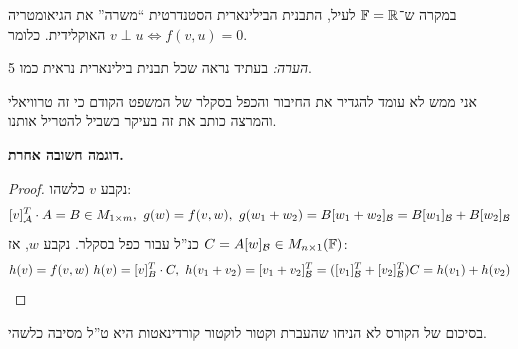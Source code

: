 \documentclass[]{../../../../tex/classes/styledArticle}
\begin{document}
    במקרה ש־$\mathbb{F} = \mathbb{R}$ לעיל, התבנית הבילינארית הסטנדרטית ``משרה'' את הגיאומטריה האוקלידית. כלומר $v \perp u \iff f(v, u) = 0$. 
    
    \textit{הערה: }בעתיד נראה שכל תבנית בילינארית נראית כמו 5. 
    
    אני ממש לא עומד להגדיר את החיבור והכפל בסקלר של המשפט הקודם כי זה טרוויאלי והמרצה כותב את זה בעיקר בשביל להטריל אותנו. 
    
    \textbf{דוגמה חשובה אחרת. }
    \begin{proof}
        נקבע $v$ כלשהו: 
        \[ [v]_{\mathcal{A}}^T \cdot A = B \in M_{1 \times m}, \ g(w) = f(v, w), \ g(w_1 + w_2) = B[w_1 + w_2]_{\mathcal{B}} = B[w_1]_{\mathcal{B}} + B[w_2]_{\mathcal{B}} \]
        כנ''ל עבור כפל בסקלר. 
        נקבע $w$, אז $C = A[w]_{\mathcal{B}} \in M_{n \times 1}(\mathbb{F})$: 
        \[ h(v) = f(v, w) \ h(v) = [v]_B^T \cdot C, \ h(v_1 + v_2) = [v_1 + v_2]_{\mathcal{B}}^T = ([v_1]_{\mathcal{B}}^T + [v_2]_{\mathcal{B}}^T)C = h(v_1) + h(v_2) \]
    \end{proof}
    בסיכום של הקורס לא הניחו שהעברת וקטור לוקטור קורדינאטות היא ט''ל מסיבה כלשהי. 
    
\end{document}
